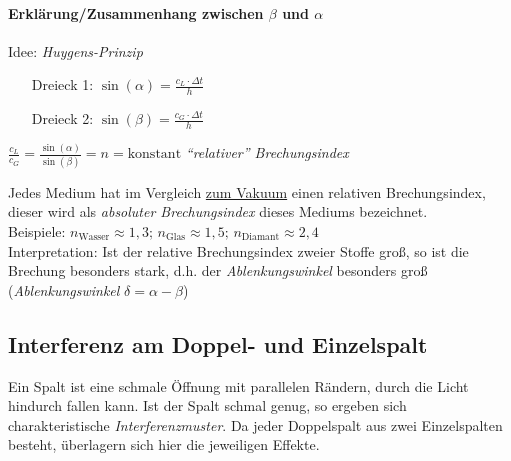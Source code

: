 \documentclass[a4paper]{scrartcl}
\begin{document}
\paragraph{Erklärung/Zusammenhang zwischen \(\beta\) und \(\alpha\)} %
Idee: \emph{Huygens-Prinzip} %
\begin{itemize}
\item[Dreieck 1:] \(\sin(\alpha) = \frac{c_L \cdot \Delta t}{h}\)
\item[Dreieck 2:] \(\sin(\beta) = \frac{c_G \cdot \Delta t}{h}\)
\end{itemize}
\(\frac{c_L}{c_G} = \frac{\sin(\alpha)}{\sin(\beta)} = n = \mathrm{konstant}\)
\emph{"`relativer"' Brechungsindex}

Jedes Medium hat im Vergleich \underline{zum Vakuum} einen relativen
Brechungsindex, dieser wird als \emph{absoluter Brechungsindex} dieses Mediums
bezeichnet.\\
Beispiele: \(n_\mathrm{Wasser} \approx 1,3;\, n_\mathrm{Glas} \approx 1,5;\,
n_\mathrm{Diamant} \approx 2,4\)\\
Interpretation: Ist der relative Brechungsindex zweier Stoffe groß, so ist die
Brechung besonders stark, d.h. der \emph{Ablenkungswinkel} besonders groß
(\emph{Ablenkungswinkel} \(\delta=\alpha-\beta\))

\subsection{Interferenz am Doppel- und Einzelspalt}
Ein Spalt ist eine schmale Öffnung mit parallelen Rändern, durch die Licht
hindurch fallen kann. Ist der Spalt schmal genug, so ergeben sich
charakteristische \emph{Interferenzmuster}.
Da jeder Doppelspalt aus zwei Einzelspalten besteht, überlagern sich hier die
jeweiligen Effekte.
\end{document}
